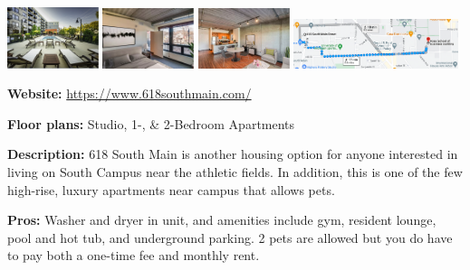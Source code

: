 \documentclass[
]{book}
\begin{document}
\includegraphics[width=0.2\textwidth,height=\textheight]{SM_exterior.png}
\includegraphics[width=0.2\textwidth,height=\textheight]{SM_interior1.png}
\includegraphics[width=0.2\textwidth,height=\textheight]{SM_interior2.png}
\includegraphics[width=0.36\textwidth,height=\textheight]{SM_map.png}

\textbf{Website:} \url{https://www.618southmain.com/}

\textbf{Floor plans:} Studio, 1-, \& 2-Bedroom Apartments

\textbf{Description:} 618 South Main is another housing option for anyone interested in living on South Campus near the athletic fields. In addition, this is one of the few high-rise, luxury apartments near campus that allows pets.

\textbf{Pros:} Washer and dryer in unit, and amenities include gym, resident lounge, pool and hot tub, and underground parking. 2 pets are allowed but you do have to pay both a one-time fee and monthly rent.

  
\end{document}
